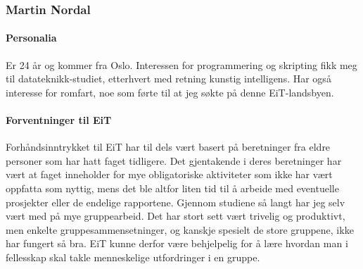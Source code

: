 \subsubsection{Martin Nordal}

\paragraph{Personalia}
Er 24 år og kommer fra Oslo.
Interessen for programmering og skripting fikk meg til datateknikk-studiet, etterhvert med retning kunstig intelligens.
Har også interesse for romfart, noe som førte til at jeg søkte på denne EiT-landsbyen.

\paragraph{Forventninger til EiT}
Forhåndsinntrykket til EiT har til dels vært basert på beretninger fra eldre personer som har hatt faget tidligere.
Det gjentakende i deres beretninger har vært at faget inneholder for mye obligatoriske aktiviteter som ikke har vært oppfatta som nyttig, mens det ble altfor liten tid til å arbeide med eventuelle prosjekter eller de endelige rapportene.
Gjennom studiene så langt har jeg selv vært med på mye gruppearbeid.
Det har stort sett vært trivelig og produktivt, men enkelte gruppesammensetninger, og kanskje spesielt de store gruppene, ikke har fungert så bra.
EiT kunne derfor være behjelpelig for å lære hvordan man i fellesskap skal takle menneskelige utfordringer i en gruppe.